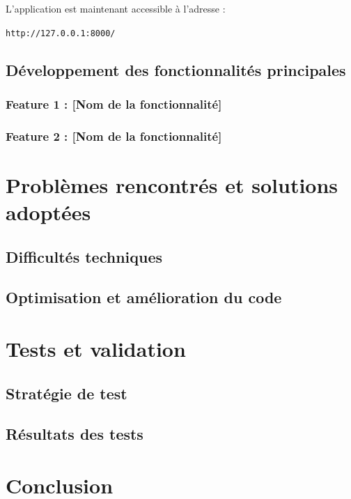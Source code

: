 L’application est maintenant accessible à l’adresse :

\begin{tcolorbox}[colback=black, coltext=white, title=URL d’accès, fonttitle=\bfseries]
\texttt{http://127.0.0.1:8000/}
\end{tcolorbox}






\subsection{Développement des fonctionnalités principales}

\subsubsection{Feature 1 : [Nom de la fonctionnalité]}

\subsubsection{Feature 2 : [Nom de la fonctionnalité]}

\section{Problèmes rencontrés et solutions adoptées}
\subsection{Difficultés techniques}

\subsection{Optimisation et amélioration du code}

\section{Tests et validation}
\subsection{Stratégie de test}

\subsection{Résultats des tests}

\section{Conclusion}
\clearpage